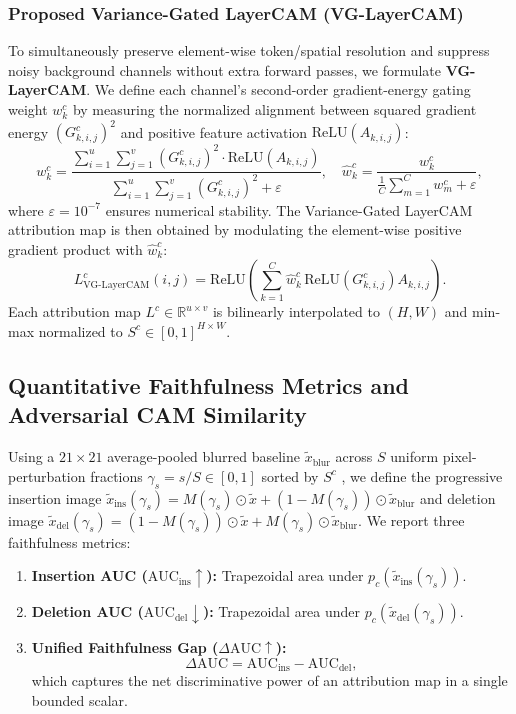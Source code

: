 \documentclass[final,5p,times,twocolumn]{elsarticle}
\begin{document}
\subsubsection{Proposed Variance-Gated LayerCAM (VG-LayerCAM)}
To simultaneously preserve element-wise token/spatial resolution and suppress noisy background channels without extra forward passes, we formulate \textbf{VG-LayerCAM}. We define each channel's second-order gradient-energy gating weight $w_k^c$ by measuring the normalized alignment between squared gradient energy $(G_{k,i,j}^c)^2$ and positive feature activation $\text{ReLU}(A_{k,i,j})$:
\begin{equation}
    w_k^c = \frac{\sum_{i=1}^{u}\sum_{j=1}^{v} \left(G_{k,i,j}^c\right)^2 \cdot \text{ReLU}(A_{k,i,j})}{\sum_{i=1}^{u}\sum_{j=1}^{v} \left(G_{k,i,j}^c\right)^2 + \varepsilon}, \quad \hat{w}_k^c = \frac{w_k^c}{\frac{1}{C}\sum_{m=1}^{C} w_m^c + \varepsilon},
    \label{eq:vg_weights}
\end{equation}
where $\varepsilon = 10^{-7}$ ensures numerical stability. The Variance-Gated LayerCAM attribution map is then obtained by modulating the element-wise positive gradient product with $\hat{w}_k^c$:
\begin{equation}
    L_{\text{VG-LayerCAM}}^c(i,j) = \text{ReLU}\!\left( \sum_{k=1}^{C} \hat{w}_k^c \, \text{ReLU}\!\left(G_{k,i,j}^c\right) A_{k,i,j} \right).
    \label{eq:vg_layercam}
\end{equation}
Each attribution map $L^c \in \mathbb{R}^{u \times v}$ is bilinearly interpolated to $(H, W)$ and min-max normalized to $S^c \in [0, 1]^{H \times W}$.

\subsection{Quantitative Faithfulness Metrics and Adversarial CAM Similarity}
Using a $21\times 21$ average-pooled blurred baseline $\tilde{x}_{\text{blur}}$ across $S$ uniform pixel-perturbation fractions $\gamma_s = s/S \in [0, 1]$ sorted by $S^c$ \cite{petsiuk2018rise,samek2016evaluating}, we define the progressive insertion image $\tilde{x}_{\text{ins}}(\gamma_s) = M(\gamma_s)\odot\tilde{x} + (1-M(\gamma_s))\odot\tilde{x}_{\text{blur}}$ and deletion image $\tilde{x}_{\text{del}}(\gamma_s) = (1-M(\gamma_s))\odot\tilde{x} + M(\gamma_s)\odot\tilde{x}_{\text{blur}}$. We report three faithfulness metrics:
\begin{enumerate}
    \item \textbf{Insertion AUC ($\text{AUC}_{\text{ins}} \uparrow$):} Trapezoidal area under $p_c(\tilde{x}_{\text{ins}}(\gamma_s))$.
    \item \textbf{Deletion AUC ($\text{AUC}_{\text{del}} \downarrow$):} Trapezoidal area under $p_c(\tilde{x}_{\text{del}}(\gamma_s))$.
    \item \textbf{Unified Faithfulness Gap ($\Delta\text{AUC} \uparrow$):}
    \begin{equation}
        \Delta\text{AUC} = \text{AUC}_{\text{ins}} - \text{AUC}_{\text{del}},
    \end{equation}
    which captures the net discriminative power of an attribution map in a single bounded scalar.
\end{enumerate}
\end{document}
